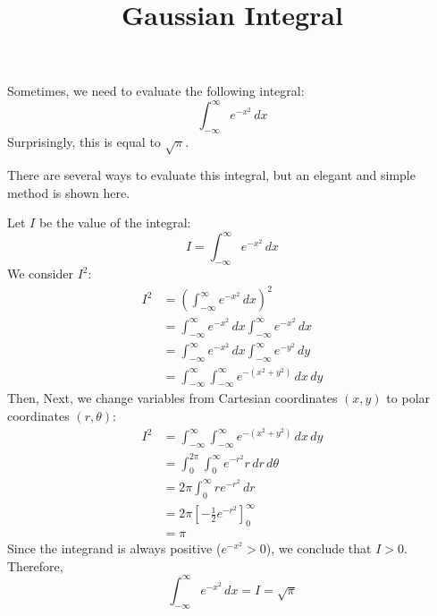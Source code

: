 \documentclass[letterpaper, 12pt]{article}
\title{Gaussian Integral}
\date{}
\theoremstyle{custom}
\begin{document}
\maketitle
Sometimes, we need to evaluate the following integral:
\begin{equation*}
  \int_{-\infty}^{\infty} e^{-x^2} \, dx
\end{equation*}
Surprisingly, this is equal to $\sqrt{\pi}$.

There are several ways to evaluate this integral, but an elegant and simple method is shown here.

Let $I$ be the value of the integral:
\begin{equation*}
  I = \int_{-\infty}^{\infty} e^{-x^2} \, dx
\end{equation*}
We consider $I^2$:
\begin{align*}
  I^2 
  &= \left( \int_{-\infty}^{\infty} e^{-x^2} \, dx \right)^2 \\
  &= \int_{-\infty}^{\infty} e^{-x^2} \, dx \int_{-\infty}^{\infty} e^{-x^2} \, dx \\
  &= \int_{-\infty}^{\infty} e^{-x^2} \, dx \int_{-\infty}^{\infty} e^{-y^2} \, dy \\
  &= \int_{-\infty}^{\infty} \int_{-\infty}^{\infty} e^{-(x^2+y^2)} \, dx \, dy
\end{align*}
Then, Next, we change variables from Cartesian coordinates $(x,y)$ to polar coordinates $(r, \theta)$:
\begin{align*}
    I^2 
  &= \int_{-\infty}^{\infty} \int_{-\infty}^{\infty} e^{-(x^2+y^2)} \, dx \, dy \\
  &= \int_{0}^{2\pi} \int_{0}^{\infty} e^{-r^2} r \, dr \, d\theta \\
  &= 2\pi \int_{0}^{\infty} re^{-r^2} \, dr \\
  &= 2\pi \left[ -\frac{1}{2}e^{-r^2} \right]_{0}^{\infty}\\
  &= \pi
\end{align*}
Since the integrand is always positive ($e^{-x^2}>0$), we conclude that $I>0$. Therefore,
\begin{equation*}
  \int_{-\infty}^{\infty} e^{-x^2} \, dx = I = \sqrt{\pi}
\end{equation*}
\end{document}
